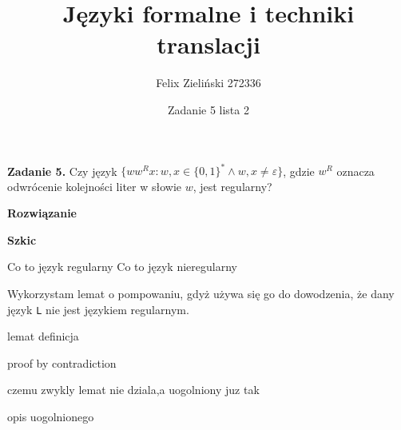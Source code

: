 \documentclass[15pt, a4paper]{article}
\title{Języki formalne i techniki translacji}
\author{Felix Zieliński 272336}
\date{Zadanie 5 lista 2}
\begin{document}
\maketitle

\vspace{0.5cm}

\noindent\hrulefill


\vspace{0.5cm}

\noindent\textbf{Zadanie 5.} Czy język \( \{ ww^R x : w, x \in \{0,1\}^* \land w, x \neq \varepsilon \} \), gdzie \( w^R \) oznacza odwrócenie kolejności liter w słowie \( w \), jest regularny?

\vspace{0.5cm}

\noindent\textbf{Rozwiązanie}

\vspace{0.5cm}

\noindent\textbf{Szkic}

Co to język regularny
Co to język nieregularny

Wykorzystam lemat o pompowaniu, gdyż używa się go do dowodzenia, że dany język \verb|L| nie jest językiem regularnym. 

lemat definicja

proof by contradiction

czemu zwykly lemat nie dziala,a uogolniony juz tak

opis uogolnionego
\end{document}
